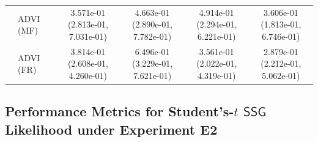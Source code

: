 \documentclass[12pt]{article}
\numberwithin{equation}{section}
\begin{document}
{\begin{longtable}{llcccc}
& ADVI (MF)
& \makecell[c]{3.571e-01\\(2.813e-01, 7.031e-01)}
& \makecell[c]{4.663e-01\\(2.890e-01, 7.782e-01)}
& \makecell[c]{4.914e-01\\(2.294e-01, 6.221e-01)}
& \makecell[c]{3.606e-01\\(1.813e-01, 6.746e-01)} \\

& ADVI (FR)
& \makecell[c]{3.814e-01\\(2.608e-01, 4.260e-01)}
& \makecell[c]{6.496e-01\\(3.229e-01, 7.621e-01)}
& \makecell[c]{3.561e-01\\(2.022e-01, 4.319e-01)}
& \makecell[c]{2.879e-01\\(2.212e-01, 5.062e-01)} \\
\hline

\end{longtable}
}

\newpage

\subsection{Performance Metrics for \texorpdfstring{Student's-$t$ $\mathsf{SSG}$}{Student's-t SSG} Likelihood under Experiment E2}\label{app-avg-metrics-student-singlen-multip}
\end{document}
